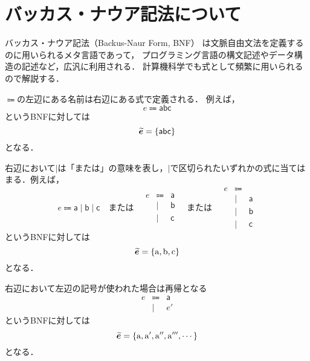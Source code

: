 \documentclass[a4paper,titlepage,report]{jsbook}
\begin{document}
\section{バッカス・ナウア記法について}\label{sc:about-BNF-form}
バッカス・ナウア記法（Backus-Naur Form, BNF）
は文脈自由文法を定義するのに用いられるメタ言語であって，
プログラミング言語の構文記述やデータ構造の記述など，広汎に利用される．
計算機科学でも式として頻繁に用いられるので解説する．

$\Coloneqq$の左辺にある名前は右辺にある式で定義される．
例えば，
\begin{equation}\label{eq:bnf-example-1} 
e\Coloneqq \mathsf{abc}
\end{equation}
というBNFに対しては
\begin{equation}
\boldsymbol{\widetilde{e}} = \{\mathsf{abc}\}
\end{equation}
となる．

右辺において$\mid$は「または」の意味を表し，$\mid$で区切られたいずれかの式に当てはまる．例えば，
\begin{equation}\label{eq:bnf-example-2} 
e\Coloneqq \mathsf{a} \mid \mathsf{b} \mid \mathsf{c}
\quad\text{または}\quad
\begin{array}{rcl}
    e    &\Coloneqq& \mathsf{a} \\
            &\mid&   \mathsf{b} \\
            &\mid&   \mathsf{c} 
\end{array}
\quad\text{または}\quad
\begin{array}{rcl}
    e    &\Coloneqq& \\
            &\mid& \mathsf{a} \\
            &\mid&   \mathsf{b} \\
            &\mid&   \mathsf{c} 
\end{array}
\end{equation}
というBNFに対しては
\begin{equation}
\boldsymbol{\widetilde{e}} = \{\mathrm{a}, \mathrm{b}, \mathrm{c}\}
\end{equation}
となる．

右辺において左辺の記号が使われた場合は再帰となる
\begin{equation}\label{eq:bnf-example-3} 
\begin{array}{rcl}
    e    &\Coloneqq& \mathsf{a} \\
            &\mid&   e\mathsf{'} 
\end{array}
\end{equation}
というBNFに対しては
\begin{equation}
\boldsymbol{\widetilde{e}} = \{\mathrm{a}, \mathrm{a'}, \mathrm{a''}, \mathrm{a'''}, \cdots \}
\end{equation}
となる．
\end{document}

